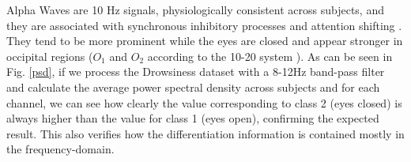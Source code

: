    
Alpha Waves are 10 Hz signals, physiologically consistent across subjects, and they are associated with synchronous inhibitory processes and attention shifting \cite{c3}. They tend to be more prominent while the eyes are closed and appear stronger in occipital regions ($O_1$ and $O_2$ according to the 10-20 system \cite{c6,c11}). As can be seen in Fig. \ref{psd}, if we process the Drowsiness dataset with a 8-12Hz band-pass filter and calculate the average power spectral density across subjects and for each channel, we can see how clearly the value corresponding to class 2 (eyes closed) is always higher than the value for class 1 (eyes open), confirming the expected result.  This also verifies how the differentiation information is contained mostly in the frequency-domain.

   
